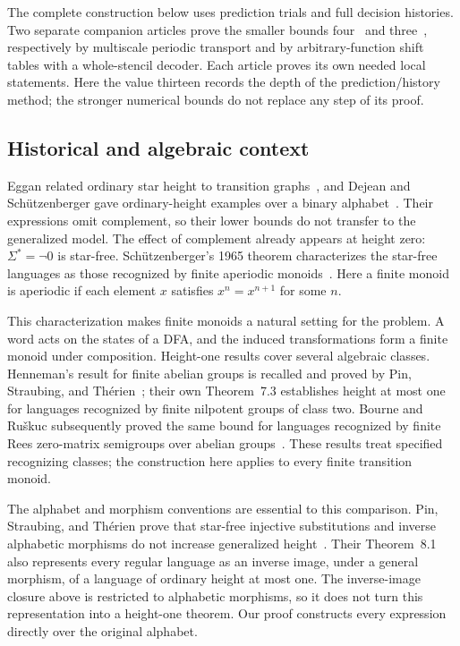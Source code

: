 The complete construction below uses prediction trials and full decision
histories. Two separate companion articles prove the smaller bounds
four~\cite[Theorem~1.1]{OpenAIHeight4} and
three~\cite[Theorem~1.1]{OpenAIHeight3}, respectively by multiscale
periodic transport and by arbitrary-function shift tables with a
whole-stencil decoder. Each article proves its own needed local statements.
Here the value thirteen records the depth of the prediction/history method;
the stronger numerical bounds do not replace any step of its proof.

\subsection*{Historical and algebraic context}

Eggan related ordinary star height to transition graphs~\cite{Eggan1963},
and Dejean and Sch\"utzenberger gave ordinary-height examples over a
binary alphabet~\cite{DejeanSchutzenberger1966}. Their expressions omit
complement, so their lower bounds do not transfer to the generalized
model. The effect of complement already appears at height zero:
\(\Sigma^*=\neg0\) is star-free. Sch\"utzenberger's 1965 theorem
characterizes the star-free languages as those recognized by finite
aperiodic monoids~\cite{Schutzenberger1965}. Here a finite monoid is
aperiodic if each element \(x\) satisfies \(x^n=x^{n+1}\) for some \(n\).

This characterization makes finite monoids a natural setting for the
problem. A word acts on the states of a DFA, and the induced
transformations form a finite monoid under composition. Height-one
results cover several algebraic classes. Henneman's
result for finite abelian groups is recalled and proved by Pin,
Straubing, and Th\'erien~\cite[Theorem~3.4]{PST1992}; their own
Theorem~7.3 establishes height at most one for languages recognized by
finite nilpotent groups of class two. Bourne and Ru\v{s}kuc subsequently
proved the same bound for languages recognized by finite Rees
zero-matrix semigroups over abelian
groups~\cite[Theorem~3.6]{BourneRuskuc2016}. These results treat specified
recognizing classes; the construction here applies to every finite
transition monoid.

The alphabet and morphism conventions are essential to this comparison.
Pin, Straubing, and Th\'erien prove that star-free injective substitutions
and inverse alphabetic morphisms do not increase generalized
height~\cite[Theorem~4.6 and Corollary~4.7]{PST1992}. Their Theorem~8.1
also represents every regular language as an inverse image, under a
general morphism, of a language of ordinary height at most one. The
inverse-image closure above is restricted to alphabetic morphisms, so it
does not turn this representation into a height-one theorem. Our proof
constructs every expression directly over the original alphabet.

